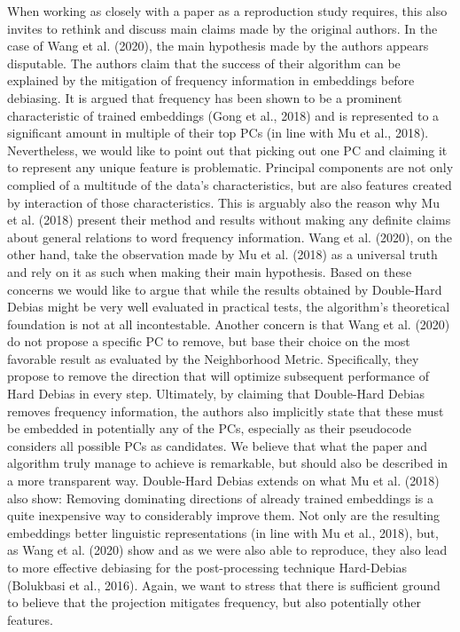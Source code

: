 \documentclass[
  english,
  man,floatsintext]{apa6}
\begin{document}
When working as closely with a paper as a reproduction study requires, this also invites to rethink and discuss main claims made by the original authors. In the case of Wang et al. (2020), the main hypothesis made by the authors appears disputable. The authors claim that the success of their algorithm can be explained by the mitigation of frequency information in embeddings before debiasing. It is argued that frequency has been shown to be a prominent characteristic of trained embeddings (Gong et al., 2018) and is represented to a significant amount in multiple of their top PCs (in line with Mu et al., 2018). Nevertheless, we would like to point out that picking out one PC and claiming it to represent any unique feature is problematic. Principal components are not only complied of a multitude of the data's characteristics, but are also features created by interaction of those characteristics. This is arguably also the reason why Mu et al. (2018) present their method and results without making any definite claims about general relations to word frequency information. Wang et al. (2020), on the other hand, take the observation made by Mu et al. (2018) as a universal truth and rely on it as such when making their main hypothesis. Based on these concerns we would like to argue that while the results obtained by Double-Hard Debias might be very well evaluated in practical tests, the algorithm's theoretical foundation is not at all incontestable.
Another concern is that Wang et al. (2020) do not propose a specific PC to remove, but base their choice on the most favorable result as evaluated by the Neighborhood Metric. Specifically, they propose to remove the direction that will optimize subsequent performance of Hard Debias in every step. Ultimately, by claiming that Double-Hard Debias removes frequency information, the authors also implicitly state that these must be embedded in potentially any of the PCs, especially as their pseudocode considers all possible PCs as candidates.
We believe that what the paper and algorithm truly manage to achieve is remarkable, but should also be described in a more transparent way. Double-Hard Debias extends on what Mu et al. (2018) also show: Removing dominating directions of already trained embeddings is a quite inexpensive way to considerably improve them. Not only are the resulting embeddings better linguistic representations (in line with Mu et al., 2018), but, as Wang et al. (2020) show and as we were also able to reproduce, they also lead to more effective debiasing for the post-processing technique Hard-Debias (Bolukbasi et al., 2016).
Again, we want to stress that there is sufficient ground to believe that the projection mitigates frequency, but also potentially other features.
\end{document}

